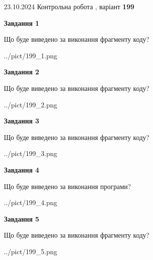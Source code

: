 \documentclass[12pt, ukrainian]{article}
\begin{document}
{\Large{23.10.2024 Контрольна робота , варіант  \No \textbf { 199 }\par}}
{
\begin {large}
{\begin {center}\textbf{Завдання 1}\end {center}}

Що буде виведено за виконання фрагменту коду?\par
\begin{center}
	{../pict/199_1.png}
\end{center}
\newpage

{\begin {center}\textbf{Завдання 2}\end {center}}

Що буде виведено за виконання фрагменту коду?\par
\begin{center}
	{../pict/199_2.png}
\end{center}
\newpage

{\begin {center}\textbf{Завдання 3}\end {center}}

Що буде виведено за виконання фрагменту коду?\par
\begin{center}
	{../pict/199_3.png}
\end{center}
\newpage

{\begin {center}\textbf{Завдання 4}\end {center}}

Що буде виведено за виконання програми?\par
\begin{center}
	{../pict/199_4.png}
\end{center}
\newpage

{\begin {center}\textbf{Завдання 5}\end {center}}

Що буде виведено за виконання фрагменту коду?\par
\begin{center}
	{../pict/199_5.png}
\end{center}
\newpage


\end{large}}
\end{document}
